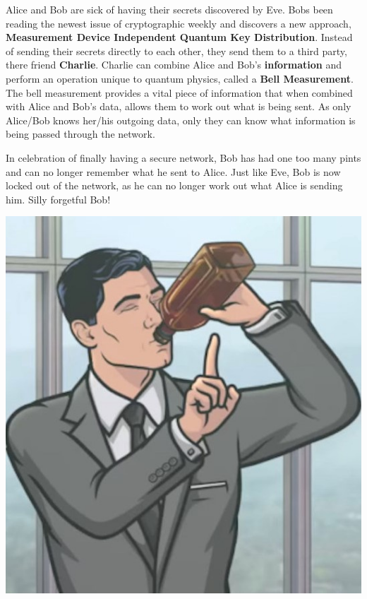 \documentclass[portrait,final,archA0,fontscale=0.372]{baposter}
\begin{document}
\begin{poster}
{\begin{multicols}{2}

\noindent Alice and Bob are sick of having their secrets discovered by Eve. Bobs been reading the newest issue of cryptographic weekly and discovers a new approach, \textbf{Measurement Device Independent Quantum Key Distribution}. Instead of sending their secrets directly to each other, they send them to a third party, there friend \textbf{Charlie}. Charlie can combine Alice and Bob's \textbf{information} and perform an operation unique to quantum physics, called a \textbf{Bell Measurement}. The bell measurement provides a vital piece of information that when combined with Alice and Bob's data, allows them to work out what is being sent. As only Alice/Bob knows her/his outgoing data, only they can know what information is being passed through the network.

\vspace{0.3cm}

\noindent In celebration of finally having a secure network, Bob has had one too many pints and can no longer remember what he sent to Alice. Just like Eve, Bob is now locked out of the network, as he can no longer work out what Alice is sending him. Silly forgetful Bob!  

\begin{center}
    \includegraphics[width=0.8\linewidth]{img/drunk_spy} 
\end{center} 

\end{multicols}
}



\end{poster}
\end{document}
